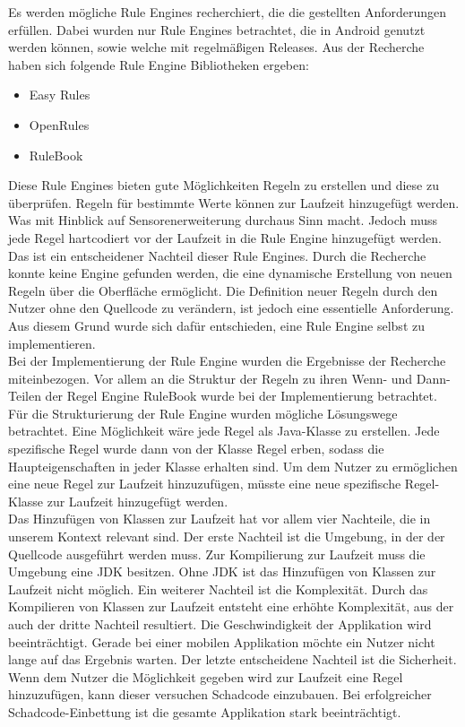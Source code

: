 Es werden mögliche Rule Engines recherchiert, die die gestellten Anforderungen erfüllen. Dabei wurden nur Rule Engines betrachtet, die in Android genutzt werden können, sowie welche mit regelmäßigen Releases. Aus der Recherche haben sich folgende Rule Engine Bibliotheken ergeben:
\begin{itemize}
	\item Easy Rules \cite{github:easyrules}
	\item OpenRules \cite{openrules}
	\item RuleBook \cite{github:rulebook}
\end{itemize}
Diese Rule Engines bieten gute Möglichkeiten Regeln zu erstellen und diese zu überprüfen. Regeln für bestimmte Werte können zur Laufzeit hinzugefügt werden. Was mit Hinblick auf Sensorenerweiterung durchaus Sinn macht. Jedoch muss jede Regel hartcodiert vor der Laufzeit in die Rule Engine hinzugefügt werden. Das ist ein entscheidener Nachteil dieser Rule Engines. Durch die Recherche konnte keine Engine gefunden werden, die eine dynamische Erstellung von neuen Regeln über die Oberfläche ermöglicht. Die Definition neuer Regeln durch den Nutzer ohne den Quellcode zu verändern, ist jedoch eine essentielle Anforderung. Aus diesem Grund wurde sich dafür entschieden, eine Rule Engine selbst zu implementieren.\\
Bei der Implementierung der Rule Engine wurden die Ergebnisse der Recherche miteinbezogen. Vor allem an die Struktur der Regeln zu ihren Wenn- und Dann-Teilen der Regel Engine RuleBook wurde bei der Implementierung betrachtet.\\
Für die Strukturierung der Rule Engine wurden mögliche Lösungswege betrachtet. Eine Möglichkeit wäre jede Regel als Java-Klasse zu erstellen. Jede spezifische Regel wurde dann von der Klasse Regel erben, sodass die Haupteigenschaften in jeder Klasse erhalten sind. Um dem Nutzer zu ermöglichen eine neue Regel zur Laufzeit hinzuzufügen, müsste eine neue spezifische Regel-Klasse zur Laufzeit hinzugefügt werden.\\
Das Hinzufügen von Klassen zur Laufzeit hat vor allem vier Nachteile, die in unserem Kontext relevant sind. Der erste Nachteil ist die Umgebung, in der der Quellcode ausgeführt werden muss. Zur Kompilierung zur Laufzeit muss die Umgebung eine JDK besitzen. Ohne JDK ist das Hinzufügen von Klassen zur Laufzeit nicht möglich. Ein weiterer Nachteil ist die Komplexität. Durch das Kompilieren von Klassen zur Laufzeit entsteht eine erhöhte Komplexität, aus der auch der dritte Nachteil resultiert. Die Geschwindigkeit der Applikation wird beeinträchtigt. Gerade bei einer mobilen Applikation möchte ein Nutzer nicht lange auf das Ergebnis warten. Der letzte entscheidene Nachteil ist die Sicherheit. Wenn dem Nutzer die Möglichkeit gegeben wird zur Laufzeit eine Regel hinzuzufügen, kann dieser versuchen Schadcode einzubauen. Bei erfolgreicher Schadcode-Einbettung ist die gesamte Applikation stark beeinträchtigt.\\

